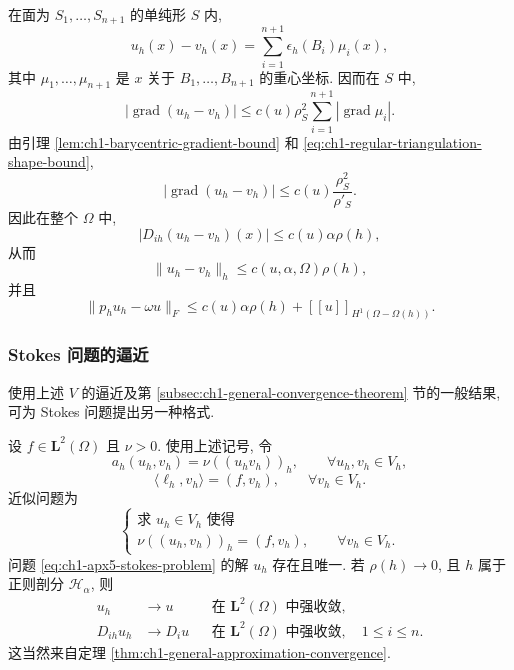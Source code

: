 \begin{Proof}
在面为 $S_1,\ldots,S_{n+1}$ 的单纯形 $S$ 内,
\[
u_h(x)-v_h(x)=\sum_{i=1}^{n+1}\epsilon_h(B_i)\mu_i(x),
\]
其中 $\mu_1,\ldots,\mu_{n+1}$ 是 $x$ 关于 $B_1,\ldots,B_{n+1}$ 的重心坐标. 因而在 $S$ 中,
\[
|\operatorname{grad}(u_h-v_h)|
\leq c(u)\rho_S^2\sum_{i=1}^{n+1}|\operatorname{grad}\mu_i|.
\]
由引理 \ref{lem:ch1-barycentric-gradient-bound} 和 \eqref{eq:ch1-regular-triangulation-shape-bound},
\[
|\operatorname{grad}(u_h-v_h)|
\leq c(u)\frac{\rho_S^2}{\rho'_S}.
\]
因此在整个 $\Omega$ 中,
\begin{equation}
|D_{ih}(u_h-v_h)(x)|\leq c(u)\alpha\rho(h),
\label{eq:ch1-apx5-broken-derivative-error}
\end{equation}
从而
\begin{equation}
\|u_h-v_h\|_h\leq c(u,\alpha,\Omega)\rho(h),
\label{eq:ch1-apx5-broken-norm-error}
\end{equation}
并且
\begin{equation}
\|p_hu_h-\omega u\|_F
\leq c(u)\alpha\rho(h)+[[u]]_{H^1(\Omega-\Omega(h))}.
\label{eq:ch1-apx5-global-convergence-estimate}
\end{equation}
\end{Proof}

\subsubsection{Stokes 问题的逼近}
\label{subsubsec:ch1-apx5-stokes}

使用上述 $V$ 的逼近及第 \ref{subsec:ch1-general-convergence-theorem} 节的一般结果, 可为 Stokes 问题提出另一种格式.

设 $f\in\mathbf L^2(\Omega)$ 且 $\nu>0$. 使用上述记号, 令
\begin{equation}
a_h(u_h,v_h)=\nu((u_hv_h))_h,
\qquad\forall u_h,v_h\in V_h,
\label{eq:ch1-apx5-bilinear-form}
\end{equation}
\begin{equation}
\langle\ell_h,v_h\rangle=(f,v_h),
\qquad\forall v_h\in V_h.
\label{eq:ch1-apx5-linear-form}
\end{equation}
近似问题为
\begin{equation}
\left\{
\begin{array}{l}
\text{求 }u_h\in V_h\text{ 使得}\\
\nu((u_h,v_h))_h=(f,v_h),
\qquad\forall v_h\in V_h.
\end{array}
\right.
\label{eq:ch1-apx5-stokes-problem}
\end{equation}
问题 \eqref{eq:ch1-apx5-stokes-problem} 的解 $u_h$ 存在且唯一. 若 $\rho(h)\to0$, 且 $h$ 属于正则剖分 $\mathcal H_\alpha$, 则
\begin{equation}
\begin{aligned}
u_h&\longrightarrow u
&&\text{在 }\mathbf L^2(\Omega)\text{ 中强收敛},\\
D_{ih}u_h&\longrightarrow D_iu
&&\text{在 }\mathbf L^2(\Omega)\text{ 中强收敛},
\quad1\leq i\leq n.
\end{aligned}
\label{eq:ch1-apx5-stokes-convergence}
\end{equation}
这当然来自定理 \ref{thm:ch1-general-approximation-convergence}.

